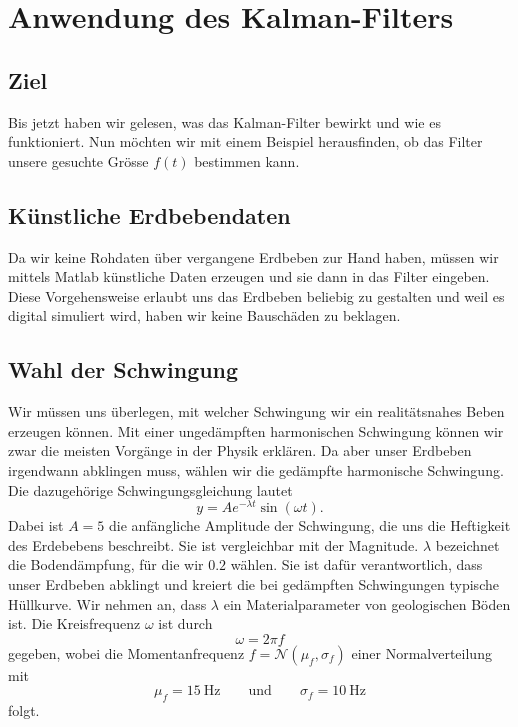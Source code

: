\section{Anwendung des Kalman-Filters}
\subsection{Ziel}
Bis jetzt haben wir gelesen, was das Kalman-Filter bewirkt und wie es funktioniert.
Nun möchten wir mit einem Beispiel herausfinden, ob das Filter unsere gesuchte Grösse $f(t)$ bestimmen kann.

\subsection{Künstliche Erdbebendaten}
Da wir keine Rohdaten über vergangene Erdbeben zur Hand haben, müssen wir mittels Matlab künstliche Daten  erzeugen und sie dann in das Filter eingeben.
Diese Vorgehensweise erlaubt uns das Erdbeben beliebig zu gestalten
und weil es digital simuliert wird, haben wir keine Bauschäden zu beklagen.

\subsection{Wahl der Schwingung}
Wir müssen uns überlegen, mit welcher Schwingung wir ein realitätsnahes Beben erzeugen können.
Mit einer ungedämpften harmonischen Schwingung können wir zwar die meisten Vorgänge in der Physik erklären.
Da aber unser Erdbeben irgendwann abklingen muss, wählen wir die gedämpfte harmonische Schwingung.
Die dazugehörige Schwingungsgleichung lautet
\begin{equation}
	y = A e^{-\lambda t} \sin(\omega t).
\end{equation}
Dabei ist $A=5$ die anfängliche Amplitude der Schwingung,
die uns die Heftigkeit des Erdebebens beschreibt.
Sie ist vergleichbar mit der Magnitude.
$\lambda$ bezeichnet die Bodendämpfung, für die wir $0.2$ wählen.
Sie ist dafür verantwortlich, dass unser Erdbeben abklingt
und kreiert die bei gedämpften Schwingungen typische Hüllkurve.
Wir nehmen an, dass $\lambda$ ein Materialparameter von geologischen Böden ist.
Die Kreisfrequenz $\omega$ ist durch
\begin{equation}
	\omega = 2 \pi f
\end{equation}
gegeben, 
wobei die Momentanfrequenz $f = \mathcal N(\mu_f, \sigma_f) $ einer Normalverteilung mit
\begin{equation}
  \mu_f = \SI{15}{\hertz}
  \qquad \text{und} \qquad
  \sigma_f = \SI{10}{\hertz}
\end{equation}
folgt.

